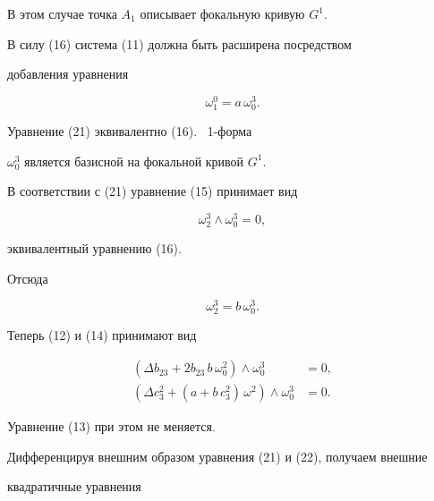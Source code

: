 \begin{pf}


В этом случае точка $A_1$ описывает фокальную кривую  $G^1$.


В силу (16) система (11) должна быть расширена посредством


добавления уравнения


\begin{equation}\label{eq:26}


\omega_1^0 = a \,\omega_0^3.


\end{equation}


Уравнение (21) эквивалентно (16). \ 1-форма


$\omega_0^3$ является базисной на фокальной кривой  $G^1$.


В соответствии с (21)  уравнение  (15) принимает вид


$$


\omega_2^3 \wedge \omega_0^3 = 0,


$$


эквивалентный уравнению (16).


Отсюда


\begin{equation}\label{eq:27}


\omega_2^3 = b\, \omega_0^3.


\end{equation}


Теперь (12) и (14) принимают вид


\begin{align}\label{eq:28}


(\Delta b_{23} + 2 b_{23}\, b \,\omega_0^2)  \wedge \omega_0^3  &=


0, \\


%


\label{eq:29}


(\Delta c_{3}^2 + (a + b \, c_3^2) \,\omega^2) \wedge \omega_0^3


&= 0.


\end{align}


Уравнение (13) при этом не меняется.





Дифференцируя внешним образом уравнения (21) и (22), получаем внешние


квадратичные уравнения


\begin{align}\label{eq:30}



\end{align}
\end{pf}
